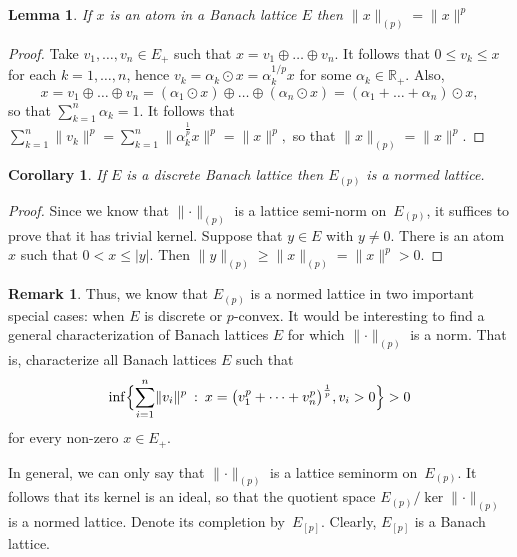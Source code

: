 \documentclass[12pt]{amsart}
\theoremstyle{plain}
\newtheorem{corollary}[theorem]{Corollary}
\newtheorem{lemma}[theorem]{Lemma}
\theoremstyle{definition}
\newtheorem{remark}[theorem]{Remark}
\newcommand{\abs}[1]{\lvert#1\rvert}
\newcommand{\norm}[1]{\lVert#1\rVert}
\newcommand{\bignorm}[1]{\bigl\lVert#1\bigr\rVert}
\renewcommand{\le}{\leqslant}
\renewcommand{\ge}{\geqslant}
\renewcommand{\mid}{\::\:}
\begin{document}
\begin{lemma}\label{atom-norm}
  If $x$ is an atom in a Banach lattice $E$ then $\norm{x}_{(p)}=\norm{x}^p$
\end{lemma}

\begin{proof}
  Take $v_1,\dots,v_n\in E_+$ such that $x=v_1\oplus\dots\oplus v_n$.
  It follows that $0\le v_k\le x$ for each $k=1,\dots,n$, hence
  $v_k=\alpha_k\odot x=\alpha_k^{1/p}x$ for some
  $\alpha_k\in\mathbb R_+$. Also,
  \begin{displaymath}
    x=v_1\oplus\dots\oplus v_n
    =(\alpha_1\odot x)\oplus\dots\oplus(\alpha_n\odot x)
    =(\alpha_1+\dots+\alpha_n)\odot x,
  \end{displaymath}
  so that $\sum_{k=1}^n\alpha_k=1$. It follows that
  \begin{math}
    \sum_{k=1}^n \norm{v_k}^p
    =\sum_{k=1}^n\bignorm{\alpha_k^{\frac{1}{p}}x}^p
    =\norm{x}^p,
  \end{math}
  so that $\norm{x}_{(p)}=\norm{x}^p$.
\end{proof}

\begin{corollary}\label{discr-norm}
  If $E$ is a discrete Banach lattice then $E_{(p)}$ is a normed lattice.
\end{corollary}

\begin{proof}
  Since we know that $\norm{\cdot}_{(p)}$ is a lattice semi-norm
  on~$E_{(p)}$, it suffices to prove that it has trivial kernel.
  Suppose that $y\in E$ with $y\ne 0$. There is an atom $x$ such that
  $0<x\le\abs{y}$. Then
  $\norm{y}_{(p)}\ge\norm{x}_{(p)}=\norm{x}^p>0$.
\end{proof}

\begin{remark}\label{Ep-normed}
  Thus, we know that $E_{(p)}$ is a normed lattice in two important
  special cases: when $E$ is discrete or $p$-convex. It would be
  interesting to find a general characterization of Banach lattices
  $E$ for which $\norm{\cdot}_{(p)}$ is a norm. That is, characterize
  all Banach lattices $E$ such that
  \begin{displaymath}
    \inf\Bigl\{\sum_{i=1}^n \norm{v_i}^p\mid
        x=\bigl(v_1^p+\dots+v_n^p\bigr)^{\frac{1}{p}},
          v_i> 0\Bigr\}>0
  \end{displaymath}
  for every non-zero $x\in E_+$.
\end{remark}

In  general, we can only say that $\norm{\cdot}_{(p)}$ is a
lattice seminorm on~$E_{(p)}$. It follows that its kernel is an ideal,
so that the quotient space $E_{(p)}/\ker\norm{\cdot}_{(p)}$ is a
normed lattice. Denote its completion by~$E_{[p]}$. Clearly, $E_{[p]}$
is a Banach lattice.
\end{document}
